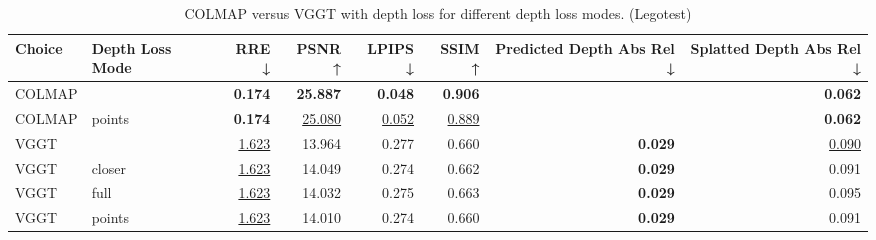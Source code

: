 \begin{table}[H]
\caption{COLMAP versus VGGT with depth loss for different depth loss modes. (Legotest)}
\label{tab:05_depth_loss_mode_legotest}
\begin{tabular}{llrrrrrr}
\toprule
Choice & Depth Loss Mode & RRE ↓ & PSNR ↑ & LPIPS ↓ & SSIM ↑ & Predicted Depth Abs Rel ↓ & Splatted Depth Abs Rel ↓ \\
\midrule
COLMAP &  & \textbf{0.174} & \textbf{25.887} & \textbf{0.048} & \textbf{0.906} &  & \textbf{0.062} \\
COLMAP & points & \textbf{0.174} & \underline{25.080} & \underline{0.052} & \underline{0.889} &  & \textbf{0.062} \\
VGGT &  & \underline{1.623} & 13.964 & 0.277 & 0.660 & \textbf{0.029} & \underline{0.090} \\
VGGT & closer & \underline{1.623} & 14.049 & 0.274 & 0.662 & \textbf{0.029} & 0.091 \\
VGGT & full & \underline{1.623} & 14.032 & 0.275 & 0.663 & \textbf{0.029} & 0.095 \\
VGGT & points & \underline{1.623} & 14.010 & 0.274 & 0.660 & \textbf{0.029} & 0.091 \\
\bottomrule
\end{tabular}
\end{table}
